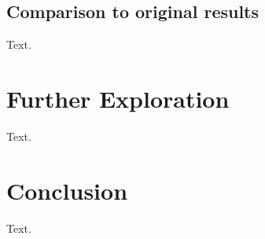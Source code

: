 \documentclass{article}
\begin{document}
\subsection{Comparison to original results}
Text.




\newpage
\section{Further Exploration}
Text.




\newpage
\section{Conclusion}
Text.





\newpage


\end{document}
